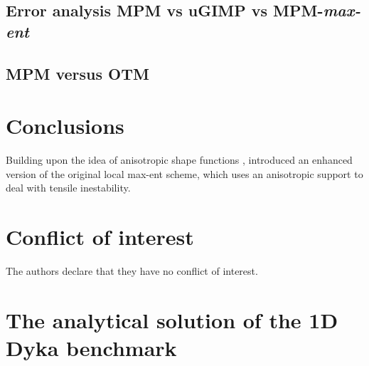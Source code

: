 \subsection{Error analysis MPM vs uGIMP vs MPM-\textit{max-ent}}
\label{sec:study-error}



\subsection{MPM versus OTM}
\label{sec:mpm-versus-otm}


\section{Conclusions}
\label{sec:conclusions}

Building upon the idea of anisotropic shape functions
\cite{Arroyo2006}, \cite{Kochmann2019} introduced an enhanced version of the
original local max-ent scheme, which uses an anisotropic support to
deal with tensile inestability.



%
\section*{Conflict of interest}
%
The authors declare that they have no conflict of interest.


\appendix
\section{The analytical solution of the 1D Dyka benchmark}
\label{app:analytical_sol}

